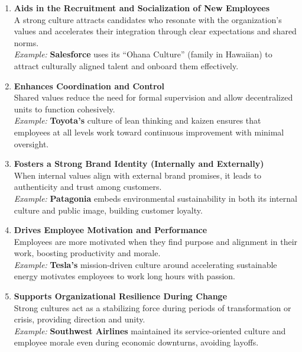 \documentclass[10pt,a4paper]{book}
\begin{document}
\begin{multicols}{2}
\begin{enumerate}
    \item \textbf{Aids in the Recruitment and Socialization of New Employees} \\
    A strong culture attracts candidates who resonate with the organization’s values and accelerates their integration through clear expectations and shared norms.\\
    \textit{Example:} \textbf{Salesforce} uses its “Ohana Culture” (family in Hawaiian) to attract culturally aligned talent and onboard them effectively.

    \item \textbf{Enhances Coordination and Control} \\
    Shared values reduce the need for formal supervision and allow decentralized units to function cohesively.\\
    \textit{Example:} \textbf{Toyota’s} culture of lean thinking and kaizen ensures that employees at all levels work toward continuous improvement with minimal oversight.

    \item \textbf{Fosters a Strong Brand Identity (Internally and Externally)} \\
    When internal values align with external brand promises, it leads to authenticity and trust among customers.\\
    \textit{Example:} \textbf{Patagonia} embeds environmental sustainability in both its internal culture and public image, building customer loyalty.

    \item \textbf{Drives Employee Motivation and Performance} \\
    Employees are more motivated when they find purpose and alignment in their work, boosting productivity and morale.\\
    \textit{Example:} \textbf{Tesla’s} mission-driven culture around accelerating sustainable energy motivates employees to work long hours with passion.

    \item \textbf{Supports Organizational Resilience During Change} \\
    Strong cultures act as a stabilizing force during periods of transformation or crisis, providing direction and unity.\\
    \textit{Example:} \textbf{Southwest Airlines} maintained its service-oriented culture and employee morale even during economic downturns, avoiding layoffs.
\end{enumerate}


\end{multicols}
\end{document}
